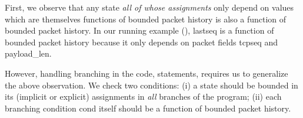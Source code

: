  First, we observe that any
state {\em all of whose assignments} only depend on values which are themselves
functions of bounded packet history is also a function of bounded packet
history. In our running example (), {\ct lastseq} is a
function of bounded packet history because it only depends on packet fields {\ct
  tcpseq} and {\ct payload\_len}.

However, handling branching in the code, 
statements, requires us to generalize the above observation. We check two
conditions: (i) a state should be bounded in its (implicit or explicit)
assignments in {\em all} branches of the program; (ii) each branching condition
{\ct cond} itself should be a function of bounded packet history.




